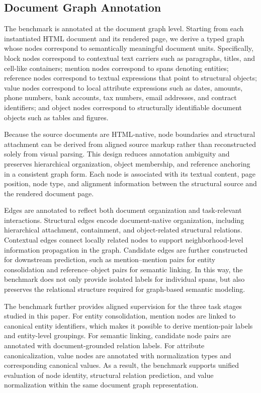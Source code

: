\documentclass[pdflatex,twocolumn,iicol,sn-vancouver-num]{sn-jnl}%
\theoremstyle{thmstyleone}%
\theoremstyle{thmstyletwo}%
\theoremstyle{thmstylethree}%
\begin{document}
\subsection{Document Graph Annotation}

The benchmark is annotated at the document graph level. Starting from each instantiated HTML document and its rendered page, we derive a typed graph whose nodes correspond to semantically meaningful document units. Specifically, block nodes correspond to contextual text carriers such as paragraphs, titles, and cell-like containers; mention nodes correspond to spans denoting entities; reference nodes correspond to textual expressions that point to structural objects; value nodes correspond to local attribute expressions such as dates, amounts, phone numbers, bank accounts, tax numbers, email addresses, and contract identifiers; and object nodes correspond to structurally identifiable document objects such as tables and figures.

Because the source documents are HTML-native, node boundaries and structural attachment can be derived from aligned source markup rather than reconstructed solely from visual parsing. This design reduces annotation ambiguity and preserves hierarchical organization, object membership, and reference anchoring in a consistent graph form. Each node is associated with its textual content, page position, node type, and alignment information between the structural source and the rendered document page.

Edges are annotated to reflect both document organization and task-relevant interactions. Structural edges encode document-native organization, including hierarchical attachment, containment, and object-related structural relations. Contextual edges connect locally related nodes to support neighborhood-level information propagation in the graph. Candidate edges are further constructed for downstream prediction, such as mention--mention pairs for entity consolidation and reference--object pairs for semantic linking. In this way, the benchmark does not only provide isolated labels for individual spans, but also preserves the relational structure required for graph-based semantic modeling.

The benchmark further provides aligned supervision for the three task stages studied in this paper. For entity consolidation, mention nodes are linked to canonical entity identifiers, which makes it possible to derive mention-pair labels and entity-level groupings. For semantic linking, candidate node pairs are annotated with document-grounded relation labels. For attribute canonicalization, value nodes are annotated with normalization types and corresponding canonical values. As a result, the benchmark supports unified evaluation of node identity, structural relation prediction, and value normalization within the same document graph representation.
\end{document}
